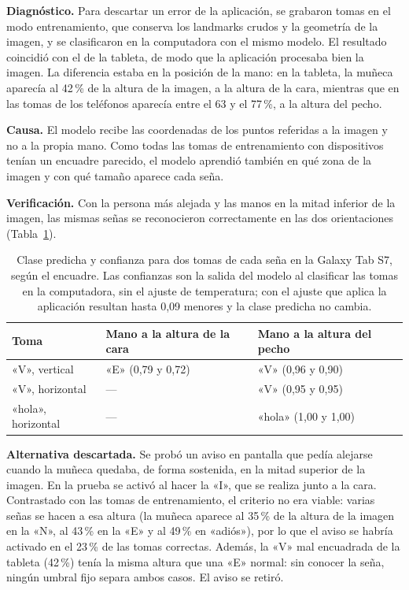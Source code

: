 \textbf{Diagnóstico.} Para descartar un error de la aplicación, se grabaron tomas en el modo entrenamiento, que conserva los landmarks crudos y la geometría de la imagen, y se clasificaron en la computadora con el mismo modelo. El resultado coincidió con el de la tableta, de modo que la aplicación procesaba bien la imagen. La diferencia estaba en la posición de la mano: en la tableta, la muñeca aparecía al 42\,\% de la altura de la imagen, a la altura de la cara, mientras que en las tomas de los teléfonos aparecía entre el 63 y el 77\,\%, a la altura del pecho.

\textbf{Causa.} El modelo recibe las coordenadas de los puntos referidas a la imagen y no a la propia mano. Como todas las tomas de entrenamiento con dispositivos tenían un encuadre parecido, el modelo aprendió también en qué zona de la imagen y con qué tamaño aparece cada seña.

\textbf{Verificación.} Con la persona más alejada y las manos en la mitad inferior de la imagen, las mismas señas se reconocieron correctamente en las dos orientaciones (Tabla~\ref{tab:encuadre}).

\begin{table}[h]
    \centering
    \begin{tabular}{lll}
        \toprule
        Toma & Mano a la altura de la cara & Mano a la altura del pecho \\
        \midrule
        «V», vertical & «E» (0,79 y 0,72) & «V» (0,96 y 0,90) \\
        «V», horizontal & --- & «V» (0,95 y 0,95) \\
        «hola», horizontal & --- & «hola» (1,00 y 1,00) \\
        \bottomrule
    \end{tabular}
    \caption{Clase predicha y confianza para dos tomas de cada seña en la Galaxy Tab S7, según el encuadre. Las confianzas son la salida del modelo al clasificar las tomas en la computadora, sin el ajuste de temperatura; con el ajuste que aplica la aplicación resultan hasta 0,09 menores y la clase predicha no cambia.}
    \label{tab:encuadre}
\end{table}

\textbf{Alternativa descartada.} Se probó un aviso en pantalla que pedía alejarse cuando la muñeca quedaba, de forma sostenida, en la mitad superior de la imagen. En la prueba se activó al hacer la «I», que se realiza junto a la cara. Contrastado con las tomas de entrenamiento, el criterio no era viable: varias señas se hacen a esa altura (la muñeca aparece al 35\,\% de la altura de la imagen en la «N», al 43\,\% en la «E» y al 49\,\% en «adiós»), por lo que el aviso se habría activado en el 23\,\% de las tomas correctas. Además, la «V» mal encuadrada de la tableta (42\,\%) tenía la misma altura que una «E» normal: sin conocer la seña, ningún umbral fijo separa ambos casos. El aviso se retiró.

